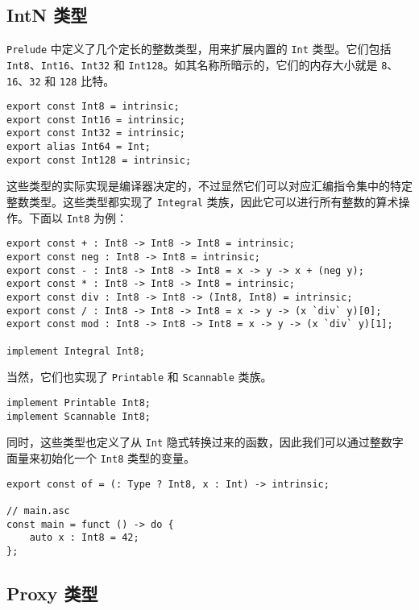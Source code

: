 \subsection{IntN 类型}

\lstinline!Prelude! 中定义了几个定长的整数类型，用来扩展内置的 \lstinline!Int! 类型。它们包括 \lstinline!Int8!、\lstinline!Int16!、\lstinline!Int32! 和 \lstinline!Int128!。如其名称所暗示的，它们的内存大小就是 \lstinline!8!、\lstinline!16!、\lstinline!32! 和 \lstinline!128! 比特。

\begin{lstlisting}
export const Int8 = intrinsic;
export const Int16 = intrinsic;
export const Int32 = intrinsic;
export alias Int64 = Int;
export const Int128 = intrinsic;
\end{lstlisting}

这些类型的实际实现是编译器决定的，不过显然它们可以对应汇编指令集中的特定整数类型。这些类型都实现了 \lstinline!Integral! 类族，因此它可以进行所有整数的算术操作。下面以 \lstinline!Int8! 为例：

\begin{lstlisting}
export const + : Int8 -> Int8 -> Int8 = intrinsic;
export const neg : Int8 -> Int8 = intrinsic;
export const - : Int8 -> Int8 -> Int8 = x -> y -> x + (neg y);
export const * : Int8 -> Int8 -> Int8 = intrinsic;
export const div : Int8 -> Int8 -> (Int8, Int8) = intrinsic;
export const / : Int8 -> Int8 -> Int8 = x -> y -> (x `div` y)[0];
export const mod : Int8 -> Int8 -> Int8 = x -> y -> (x `div` y)[1];

implement Integral Int8;
\end{lstlisting}

当然，它们也实现了 \lstinline!Printable! 和 \lstinline!Scannable! 类族。

\begin{lstlisting}
implement Printable Int8;
implement Scannable Int8;
\end{lstlisting}

同时，这些类型也定义了从 \lstinline!Int! 隐式转换过来的函数，因此我们可以通过整数字面量来初始化一个 \lstinline!Int8! 类型的变量。

\begin{lstlisting}
export const of = (: Type ? Int8, x : Int) -> intrinsic;

// main.asc
const main = funct () -> do {
    auto x : Int8 = 42;
};
\end{lstlisting}



\subsection{Proxy 类型}

